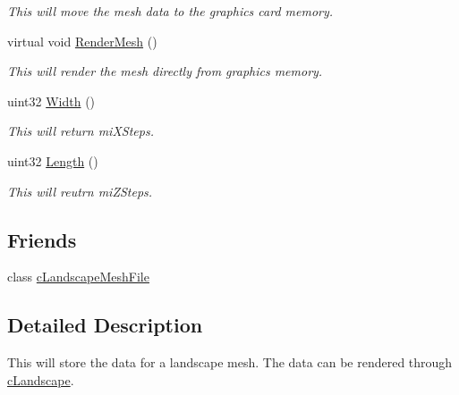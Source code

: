 \begin{DoxyCompactItemize}
\begin{DoxyCompactList}\small\item\em This will move the mesh data to the graphics card memory. \end{DoxyCompactList}\item 
\hypertarget{classcm_landscape_ad067bfe6199f7a42f2a35c72a97d676d}{
virtual void \hyperlink{classcm_landscape_ad067bfe6199f7a42f2a35c72a97d676d}{RenderMesh} ()}
\label{classcm_landscape_ad067bfe6199f7a42f2a35c72a97d676d}

\begin{DoxyCompactList}\small\item\em This will render the mesh directly from graphics memory. \end{DoxyCompactList}\item 
\hypertarget{classcm_landscape_ab6cabac9d07c5eedbbc7ac486923c8a5}{
uint32 \hyperlink{classcm_landscape_ab6cabac9d07c5eedbbc7ac486923c8a5}{Width} ()}
\label{classcm_landscape_ab6cabac9d07c5eedbbc7ac486923c8a5}

\begin{DoxyCompactList}\small\item\em This will return miXSteps. \end{DoxyCompactList}\item 
\hypertarget{classcm_landscape_a52b5ec340ef68b2a601fdca23607c3db}{
uint32 \hyperlink{classcm_landscape_a52b5ec340ef68b2a601fdca23607c3db}{Length} ()}
\label{classcm_landscape_a52b5ec340ef68b2a601fdca23607c3db}

\begin{DoxyCompactList}\small\item\em This will reutrn miZSteps. \end{DoxyCompactList}\end{DoxyCompactItemize}
\subsection*{Friends}
\begin{DoxyCompactItemize}
\item 
\hypertarget{classcm_landscape_aa170c6f782be192b0b2fe0bb3bac46b3}{
class \hyperlink{classcm_landscape_aa170c6f782be192b0b2fe0bb3bac46b3}{cLandscapeMeshFile}}
\label{classcm_landscape_aa170c6f782be192b0b2fe0bb3bac46b3}

\end{DoxyCompactItemize}


\subsection{Detailed Description}
This will store the data for a landscape mesh. The data can be rendered through \hyperlink{classc_landscape}{cLandscape}. 

